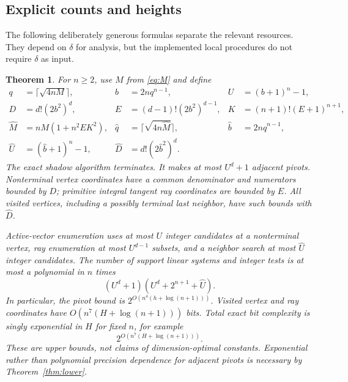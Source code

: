 \documentclass[11pt]{article}
\newtheorem{theorem}{Theorem}[section]
\theoremstyle{remark}\newtheorem{remark}[theorem]{Remark}
\begin{document}
\subsection{Explicit counts and heights}
The following deliberately generous formulas separate the relevant resources. They depend on $\delta$ for analysis, but the implemented local procedures do not require $\delta$ as input.
\begin{theorem}\label{thm:complexity}
For $n\ge2$, use $M$ from \eqref{eq:M} and define
\begin{align}
 q&=\lceil\sqrt{4nM}\rceil,& b&=2nq^{n-1},& U&=(b+1)^n-1,\label{eq:counts1}\\
 D&=d!(2b^2)^d,& E&=(d-1)!(2b^2)^{d-1},& K&=(n+1)!(E+1)^{n+1},\label{eq:counts2}\\
 \widehat M&=nM(1+n^2 E K^2),&
 \widehat q&=\lceil\sqrt{4n\widehat M}\rceil,&
 \widehat b&=2n\widehat q^{n-1},\label{eq:counts3}\\
 \widehat U&=(\widehat b+1)^n-1,&
 \widehat D&=d!(2\widehat b^2)^d.\nonumber
\end{align}
The exact shadow algorithm terminates. It makes at most $U^d+1$ adjacent pivots. Nonterminal vertex coordinates have a common denominator and numerators bounded by $D$; primitive integral tangent ray coordinates are bounded by $E$. All visited vertices, including a possibly terminal last neighbor, have such bounds with $\widehat D$.

Active-vector enumeration uses at most $U$ integer candidates at a nonterminal vertex, ray enumeration at most $U^{d-1}$ subsets, and a neighbor search at most $\widehat U$ integer candidates. The number of support linear systems and integer tests is at most a polynomial in $n$ times
\begin{equation}\label{eq:totalcount}
 (U^d+1)(U^d+2^{n+1}+\widehat U).
\end{equation}
In particular, the pivot bound is $2^{O(n^4(h+\log(n+1)))}$. Visited vertex and ray coordinates have $O(n^7(H+\log(n+1)))$ bits. Total exact bit complexity is singly exponential in $H$ for fixed $n$, for example
\[
 2^{O(n^7(H+\log(n+1)))}.
\]
These are upper bounds, not claims of dimension-optimal constants. Exponential rather than polynomial precision dependence for adjacent pivots is necessary by Theorem~\ref{thm:lower}.
\end{theorem}
\end{document}
